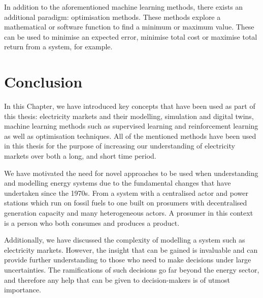 In addition to the aforementioned machine learning methods, there exists an additional paradigm: optimisation methods. These methods explore a mathematical or software function to find a minimum or maximum value. These can be used to minimise an expected error, minimise total cost or maximise total return from a system, for example.





\section{Conclusion}
\label{sec:intro:conclusion}

In this Chapter, we have introduced key concepts that have been used as part of this thesis: electricity markets and their modelling, simulation and digital twins, machine learning methods such as supervised learning and reinforcement learning as well as optimisation techniques. All of the mentioned methods have been used in this thesis for the purpose of increasing our understanding of electricity markets over both a long, and short time period.

We have motivated the need for novel approaches to be used when understanding and modelling energy systems due to the fundamental changes that have undertaken since the 1970s. From a system with a centralised actor and power stations which run on fossil fuels to one built on prosumers with decentralised generation capacity and many heterogeneous actors. A prosumer in this context is a person who both consumes and produces a product. 

Additionally, we have discussed the complexity of modelling a system such as electricity markets. However, the insight that can be gained is invaluable and can provide further understanding to those who need to make decisions under large uncertainties. The ramifications of such decisions go far beyond the energy sector, and therefore any help that can be given to decision-makers is of utmost importance.


